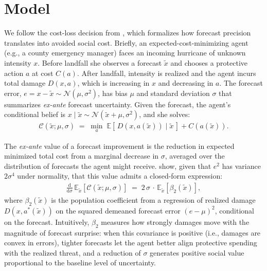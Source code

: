 \documentclass[12pt]{article}%
\begin{document}
\section{Model} \label{sec:model}

We follow the cost-loss decision from \citet{molina2024social}, which formalizes how forecast precision translates into avoided social cost. Briefly, an expected-cost-minimizing agent (e.g., a county emergency manager) faces an incoming hurricane of unknown intensity $x$. Before landfall she observes a forecast $\tilde{x}$ and chooses a protective action $a$ at cost $C(a)$. After landfall, intensity is realized and the agent incurs total damage $D(x, a)$, which is increasing in $x$ and decreasing in $a$. The forecast error, $e = x - \tilde{x} \sim \mathcal{N}(\mu, \sigma^2)$, has bias $\mu$ and standard deviation $\sigma$ that summarizes \emph{ex-ante} forecast uncertainty. Given the forecast, the agent's conditional belief is $x \mid \tilde{x} \sim \mathcal{N}(\tilde{x}+\mu,\sigma^2)$, and she solves:
\begin{align}\label{eq:agent_problem}
    \mathcal{C}(\tilde{x};\mu,\sigma) \;=\;
    \min_{a}\;\mathbb{E}\!\left[\,D(x,a(\tilde{x}))\mid \tilde{x}\,\right] + C(a(\tilde{x})).
\end{align}

The \emph{ex-ante} value of a forecast improvement is the reduction in expected minimized total cost from a marginal decrease in $\sigma$, averaged over the distribution of forecasts the agent might receive. \citet{molina2024social} show, given that $e^2$ has variance $2\sigma^4$ under normality, that this value admits a closed-form expression:
\begin{align}\label{eq:voi_marginal}
    \frac{\mathrm{d}}{\mathrm{d}\sigma}\,\mathbb{E}_{\tilde{x}}\!\left[\mathcal{C}(\tilde{x};\mu,\sigma)\right] \;=\;
    2\,\sigma\,\cdot\,\mathbb{E}_{\tilde{x}}\!\left[\beta_{2}(\tilde{x})\right],
\end{align}
where $\beta_{2}(\tilde{x})$ is the population coefficient from a regression of realized damage $D(x,a^{*}(\tilde{x}))$ on the squared demeaned forecast error $(e-\mu)^{2}$, conditional on the forecast. Intuitively, $\beta_{2}$ measures how strongly damages move with the magnitude of forecast surprise: when this covariance is positive (i.e., damages are convex in errors), tighter forecasts let the agent better align protective spending with the realized threat, and a reduction of $\sigma$ generates positive social value proportional to the baseline level of uncertainty.
\end{document}
